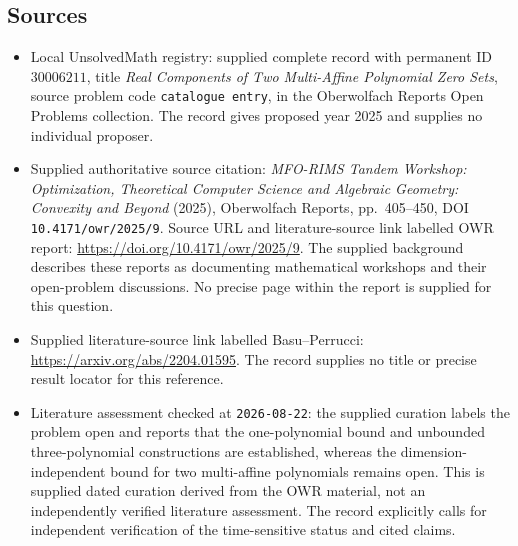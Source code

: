 \documentclass[11pt]{article}
\begin{document}
\subsection{Sources}
\begin{itemize}
\item Local UnsolvedMath registry: supplied complete record with permanent ID \(30006211\), title \emph{Real Components of Two Multi-Affine Polynomial Zero Sets}, source problem code \texttt{catalogue entry}, in the Oberwolfach Reports Open Problems collection. The record gives proposed year 2025 and supplies no individual proposer.
\item Supplied authoritative source citation: \emph{MFO-RIMS Tandem Workshop: Optimization, Theoretical Computer Science and Algebraic Geometry: Convexity and Beyond} (2025), Oberwolfach Reports, pp.\ 405--450, DOI \texttt{10.4171/owr/2025/9}. Source URL and literature-source link labelled OWR report: \url{https://doi.org/10.4171/owr/2025/9}. The supplied background describes these reports as documenting mathematical workshops and their open-problem discussions. No precise page within the report is supplied for this question.
\item Supplied literature-source link labelled Basu--Perrucci: \url{https://arxiv.org/abs/2204.01595}. The record supplies no title or precise result locator for this reference.
\item Literature assessment checked at \texttt{2026-08-22}: the supplied curation labels the problem open and reports that the one-polynomial bound and unbounded three-polynomial constructions are established, whereas the dimension-independent bound for two multi-affine polynomials remains open. This is supplied dated curation derived from the OWR material, not an independently verified literature assessment. The record explicitly calls for independent verification of the time-sensitive status and cited claims.
\end{itemize}
\end{document}
